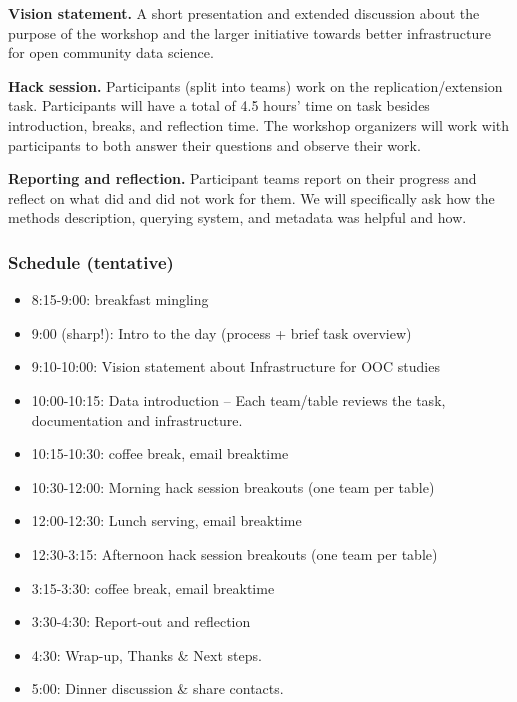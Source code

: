 \textbf{Vision statement.} A short presentation and extended discussion about the purpose of the workshop and the larger initiative towards better infrastructure for open community data science.

\textbf{Hack session.} Participants (split into teams) work on the replication/extension task.  Participants will have a total of 4.5 hours' time on task besides introduction, breaks, and reflection time.  The workshop organizers will work with participants to both answer their questions and observe their work.

\textbf{Reporting and reflection.} Participant teams report on their progress and reflect on what did and did not work for them.  We will specifically ask how the methods description, querying system, and metadata was helpful and how.

\subsubsection{Schedule (tentative)}
\begin{itemize}
\item 8:15-9:00: breakfast mingling
\item 9:00 (sharp!): Intro to the day (process + brief task overview)
\item 9:10-10:00: Vision statement about Infrastructure for OOC studies
\item 10:00-10:15: Data introduction -- Each team/table reviews the task, documentation and infrastructure.
\item 10:15-10:30: coffee break, email breaktime
\item 10:30-12:00: Morning hack session breakouts (one team per table)
\item 12:00-12:30: Lunch serving, email breaktime
\item 12:30-3:15: Afternoon hack session breakouts (one team per table)
\item 3:15-3:30: coffee break, email breaktime
\item 3:30-4:30: Report-out and reflection
\item 4:30: Wrap-up, Thanks \& Next steps.
\item 5:00: Dinner discussion \& share contacts.
\end{itemize}
